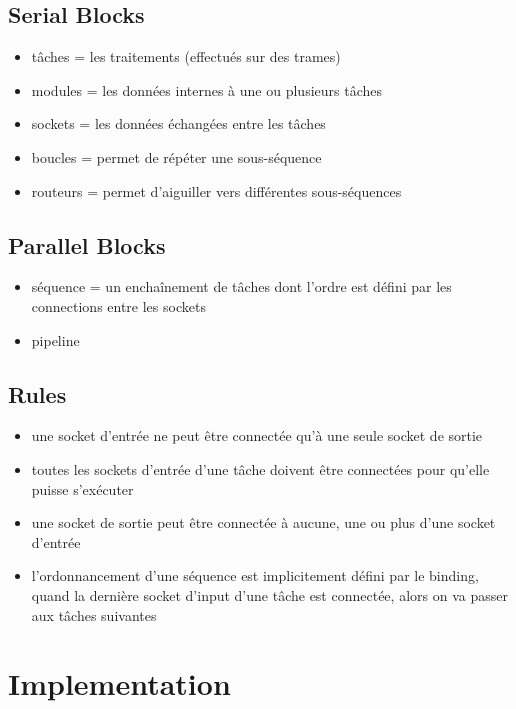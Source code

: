 \subsection{Serial Blocks}

\begin{itemize}
  \item tâches = les traitements (effectués sur des trames)
  \item modules = les données internes à une ou plusieurs tâches
  \item sockets = les données échangées entre les tâches
  \item boucles = permet de répéter une sous-séquence
  \item routeurs = permet d'aiguiller vers différentes sous-séquences
\end{itemize}

\subsection{Parallel Blocks}

\begin{itemize}
  \item séquence = un enchaînement de tâches dont l'ordre est défini par les
        connections entre les sockets
  \item pipeline
\end{itemize}

\subsection{Rules}

\begin{itemize}
  \item une socket d'entrée ne peut être connectée qu'à une seule socket de
        sortie
  \item toutes les sockets d'entrée d'une tâche doivent être connectées pour
        qu'elle puisse s'exécuter
  \item une socket de sortie peut être connectée à aucune, une ou plus d'une
        socket d'entrée
  \item l'ordonnancement d'une séquence est implicitement défini par le binding,
        quand la dernière socket d'input d'une tâche est connectée, alors on va
        passer aux tâches suivantes
\end{itemize}

\section{Implementation}

